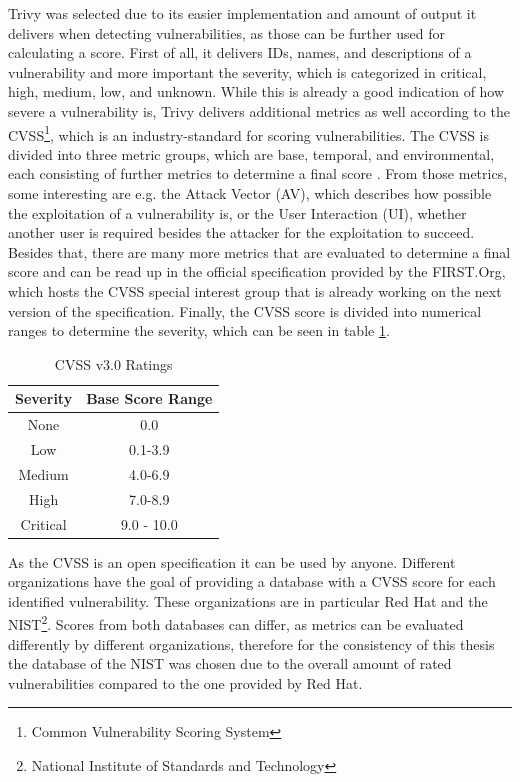 Trivy was selected due to its easier implementation and amount of output it delivers when detecting vulnerabilities, as those can be further used for calculating a score. First of all, it delivers IDs, names, and descriptions of a vulnerability and more important the severity, which is categorized in critical, high, medium, low, and unknown. While this is already a good indication of how severe a vulnerability is, Trivy delivers additional metrics as well according to the CVSS\footnote{Common Vulnerability Scoring System}, which is an industry-standard for scoring vulnerabilities. The CVSS is divided into three metric groups, which are base, temporal, and environmental, each consisting of further metrics to determine a final score \cite{cvss}.
From those metrics, some interesting are e.g. the Attack Vector (AV), which describes how possible the exploitation of a vulnerability is, or the User Interaction (UI), whether another user is required besides the attacker for the exploitation to succeed. Besides that, there are many more metrics that are evaluated to determine a final score and can be read up in the official specification provided by the FIRST.Org, which hosts the CVSS special interest group that is already working on the next version of the specification.
Finally, the CVSS score is divided into numerical ranges to determine the severity, which can be seen in table \ref{cvss_table}.
\begin{table}[h!]
    \centering
    \begin{tabular}{ |c|c| }
    \hline
    Severity & Base Score Range \\
    \hline
         None & 0.0 \\
         Low & 0.1-3.9\\
         Medium & 4.0-6.9\\
         High & 7.0-8.9\\
         Critical & 9.0 - 10.0\\
    \hline
    \end{tabular}
    \caption{CVSS v3.0 Ratings}
    \label{cvss_table}
\end{table}

As the CVSS is an open specification it can be used by anyone. Different organizations have the goal of providing a database with a CVSS score for each identified vulnerability. These organizations are in particular Red Hat and the NIST\footnote{National Institute of Standards and Technology}. Scores from both databases can differ, as metrics can be evaluated differently by different organizations, therefore for the consistency of this thesis the database of the NIST was chosen due to the overall amount of rated vulnerabilities compared to the one provided by Red Hat.
